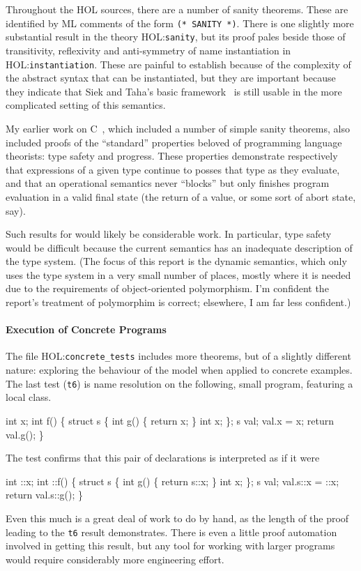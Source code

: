 \documentclass[11pt]{article}
\newcommand{\HOLfile}[1]{HOL:\texttt{#1}}
\begin{document}
Throughout the HOL sources, there are a number of sanity theorems.
These are identified by ML comments of the form \texttt{(*~SANITY~*)}.
There is one slightly more substantial result in the theory
\HOLfile{sanity}, but its proof pales beside those of transitivity,
reflexivity and anti-symmetry of name instantiation in
\HOLfile{instantiation}.  These are painful to establish because of
the complexity of the abstract syntax that can be instantiated, but
they are important because they indicate that Siek and Taha's basic
framework~\cite{DBLP:conf/ecoop/SiekT06} is still usable in the more
complicated setting of this \cpp{} semantics.

My earlier work on C~\cite{Norrish98}, which included a number of
simple sanity theorems, also included proofs of the ``standard''
properties beloved of programming language theorists: type safety and
progress.  These properties demonstrate respectively that expressions
of a given type continue to posses that type as they evaluate, and
that an operational semantics never ``blocks'' but only finishes
program evaluation in a valid final state (the return of a value, or
some sort of abort state, say).

Such results for \cpp{} would likely be considerable work.  In
particular, type safety would be difficult because the current
semantics has an inadequate description of the type system. (The focus
of this report is the dynamic semantics, which only uses the type
system in a very small number of places, mostly where it is needed due
to the requirements of object-oriented polymorphism.  I'm confident
the report's treatment of polymorphim is correct; elsewhere, I am far
less confident.)

\paragraph{Execution of Concrete Programs}
The file \HOLfile{concrete_tests} includes more theorems, but of a
slightly different nature: exploring the behaviour of the model when
applied to concrete examples.   The
last test (\texttt{t6}) is name resolution on the following, small
program, featuring a local class.
\begin{stdrule}
   int x;
   int f()
   \{
     struct s \{
       int g() \{ return x; \}
       int x;
     \};
     s val;
     val.x = x;
     return val.g();
   \}
\end{stdrule}
The test confirms that this pair of declarations is interpreted as if
it were
\begin{stdrule}
   int ::x;
   int ::f()
   \{
     struct s \{
       int g() \{ return s::x; \}
       int x;
     \};
     s val;
     val.s::x = ::x;
     return val.s::g();
   \}
\end{stdrule}
Even this much is a great deal of work to do by hand, as the length of
the proof leading to the \texttt{t6} result demonstrates.  There is
even a little proof automation involved in getting this result, but
any tool for working with larger programs would require considerably
more engineering effort.
\end{document}

